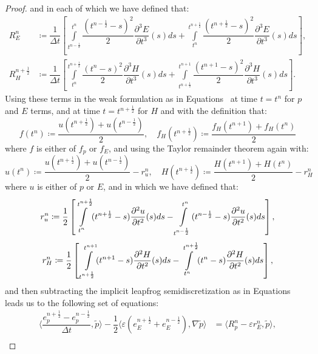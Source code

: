 \documentclass{amsart}
\theoremstyle{thmstyleone}%
\theoremstyle{thmstyletwo}%
\theoremstyle{thmstylethree}%
\newcommand{\aInnerproduct}[2]{\bigl\langle #1, #2 \bigr\rangle}
\begin{document}
\begin{proof}
and in each of which we have defined that:
\begin{align*}
  R^n_E &\coloneq \dfrac{1}{\Delta t} \left[ \int\limits_{t^{n - \frac{1}{2}}}^{t^n} \dfrac{(t^{n - \frac{1}{2}} - s)^2}{2} \dfrac{\partial^3 E}{\partial t^3}(s) ds + \int\limits_{t^n}^{t^{n + \frac{1}{2}}} \dfrac{(t^{n + \frac{1}{2}} - s)^2}{2} \dfrac{\partial^3 E}{\partial t^3}(s) ds \right], \\
R^{n + \frac{1}{2}}_H &\coloneq \dfrac{1}{\Delta t} \left[ \int\limits_{t^n}^{t^{n + \frac{1}{2}}} \dfrac{(t^n - s)^2}{2} \dfrac{\partial^3 H}{\partial t^3}(s) ds + \int\limits_{t^{n + \frac{1}{2}}}^{t^{n + 1}} \dfrac{(t^{n + 1} - s)^2}{2} \dfrac{\partial^3 H}{\partial t^3}(s) ds\right].
\end{align*}
Using these terms in the weak formulation as in Equations~  at time $t = t^n$ for $p$ and $E$ terms, and at time $t = t^{n + \frac{1}{2}}$ for $H$ and with the definition that:
\[
  f(t^n) \coloneq \dfrac{u(t^{n + \frac{1}{2}}) + u(t^{n - \frac{1}{2}})}{2}, \quad f_H(t^{n + \frac{1}{2}}) \coloneq \dfrac{f_H(t^{n+1}) + f_H(t^n)}{2}
\] 
where $f$ is either of $f_p$ or $f_E$, and using the Taylor remainder theorem again with:
\[
  u(t^n) \coloneq \dfrac{u(t^{n + \frac{1}{2}}) + u(t^{n - \frac{1}{2}})}{2} - r_u^n, \quad H(t^{n + \frac{1}{2}}) \coloneq \dfrac{H(t^{n+1}) + H(t^n)}{2} - r_H^n
\] 
where $u$ is either of $p$ or $E$, and in which we have defined that:
\[
r_u^n \coloneqq \dfrac{1}{2} \left[\int\limits_{\mathclap{t^n}}^{t^{n + \frac{1}{2}}} (t^{n + \frac{1}{2}} - s) \dfrac{\partial^2 u}{\partial t^2}(s) ds - \int\limits_{t^{n - \frac{1}{2}}}^{t^n} (t^{n - \frac{1}{2}} - s) \dfrac{\partial^2 u}{\partial t^2}(s) ds\right],
\]
\[
r_H^n \coloneqq \dfrac{1}{2} \left[\,\, \int\limits_{\mathclap{t^{n + \frac{1}{2}}}}^{t^{n+1}} (t^{n+1} - s) \dfrac{\partial^2 H}{\partial t^2}(s) ds - \int\limits_{t^n}^{t^{n + \frac{1}{2}}} (t^n - s) \dfrac{\partial^2 H}{\partial t^2}(s) ds\right],
\]
and then subtracting the implicit leapfrog semidiscretization as in Equations~ leads us to the following set of equations:
\begin{align*}
\aInnerproduct{\dfrac{e_p^{n + \frac{1}{2}} - e_p^{n - \frac{1}{2}}}{\Delta t}}{\widetilde{p}} - \dfrac{1}{2} \aInnerproduct{ \varepsilon \left(e_E^{n + \frac{1}{2}} + e_E^{n - \frac{1}{2}} \right)}{\nabla \widetilde{p}} &= \aInnerproduct{R_p^{n} - \varepsilon r_E^n}{\widetilde{p}}, \\

\end{align*}
\end{proof}
\end{document}
